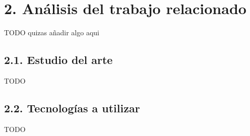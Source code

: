 \chapter*{2. Análisis del trabajo relacionado}\label{cap:analysis}

TODO quizas añadir algo aqui

\section*{2.1. Estudio del arte}\label{sec:art}

TODO

\section*{2.2. Tecnologías a utilizar}\label{sec:technologies}

TODO